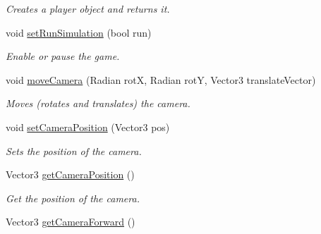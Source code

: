 \begin{DoxyCompactItemize}
\begin{DoxyCompactList}\small\item\em \-Creates a player object and returns it. \end{DoxyCompactList}\item 
\hypertarget{classGame_aad3d7d25c8e7f8958b6b1df5c99a40f2}{
void \hyperlink{classGame_aad3d7d25c8e7f8958b6b1df5c99a40f2}{set\-Run\-Simulation} (bool run)}
\label{d9/d68/classGame_aad3d7d25c8e7f8958b6b1df5c99a40f2}

\begin{DoxyCompactList}\small\item\em \-Enable or pause the game. \end{DoxyCompactList}\item 
\hypertarget{classGame_a7572753bdf1457e158d458de59a513f7}{
void \hyperlink{classGame_a7572753bdf1457e158d458de59a513f7}{move\-Camera} (\-Radian rot\-X, \-Radian rot\-Y, \-Vector3 translate\-Vector)}
\label{d9/d68/classGame_a7572753bdf1457e158d458de59a513f7}

\begin{DoxyCompactList}\small\item\em \-Moves (rotates and translates) the camera. \end{DoxyCompactList}\item 
\hypertarget{classGame_a510fa38a580252b9da8a89bba463ceeb}{
void \hyperlink{classGame_a510fa38a580252b9da8a89bba463ceeb}{set\-Camera\-Position} (\-Vector3 pos)}
\label{d9/d68/classGame_a510fa38a580252b9da8a89bba463ceeb}

\begin{DoxyCompactList}\small\item\em \-Sets the position of the camera. \end{DoxyCompactList}\item 
\hypertarget{classGame_a29c581413193a8ec8edec76310d86c1d}{
\-Vector3 \hyperlink{classGame_a29c581413193a8ec8edec76310d86c1d}{get\-Camera\-Position} ()}
\label{d9/d68/classGame_a29c581413193a8ec8edec76310d86c1d}

\begin{DoxyCompactList}\small\item\em \-Get the position of the camera. \end{DoxyCompactList}\item 
\hypertarget{classGame_a0645aadd331312ae30f688e888f24020}{
\-Vector3 \hyperlink{classGame_a0645aadd331312ae30f688e888f24020}{get\-Camera\-Forward} ()}
\label{d9/d68/classGame_a0645aadd331312ae30f688e888f24020}


\end{DoxyCompactItemize}
